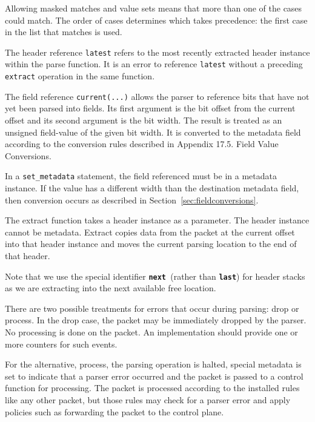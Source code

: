 \documentclass[12pt]{article}
\begin{document}
Allowing masked matches and value sets means that more than one of the cases 
could match. The order of cases determines which takes precedence: the first 
case in the list that matches is used.

The header reference \texttt{latest} refers to the most recently extracted header 
instance within the parse function.  It is an error to reference \texttt{latest} without 
a preceding \texttt{extract} operation in the same function.

The field reference \texttt{current(...)} allows the parser to reference bits that 
have not yet been parsed into fields. Its first argument is the bit offset 
from the current offset and its second argument is the bit width.  The result 
is treated as an unsigned field-value of the given bit width. It is converted 
to the metadata field according to the conversion rules described in Appendix 
17.5. Field Value Conversions.

In a \texttt{set_metadata} statement, the field referenced must be in a metadata 
instance. If the value has a different width than the destination metadata 
field, then conversion occurs as described in Section~\ref{sec:fieldconversions}.


The extract function takes a header instance as a parameter.  The header instance 
cannot be metadata. Extract copies data from the packet at the current offset 
into that header instance and moves the current parsing location to the end 
of that header.

Note that we use the special identifier \texttt{\textbf{next} }(rather than \texttt{\textbf{last}}) for header 
stacks as we are extracting into the next available free location. 


There are two possible treatments for errors that occur during parsing: drop 
or process. In the drop case, the packet may be immediately dropped by the 
parser. No \matchaction processing is done on the packet. An implementation 
should provide one or more counters for such events.

For the alternative, process, the parsing operation is halted, special metadata 
is set to indicate that a parser error occurred and the packet is passed to 
a control function for \matchaction processing. The packet is processed according 
to the installed \matchaction rules like any other packet, but those rules 
may check for a parser error and apply policies such as forwarding the packet 
to the control plane.
\end{document}
